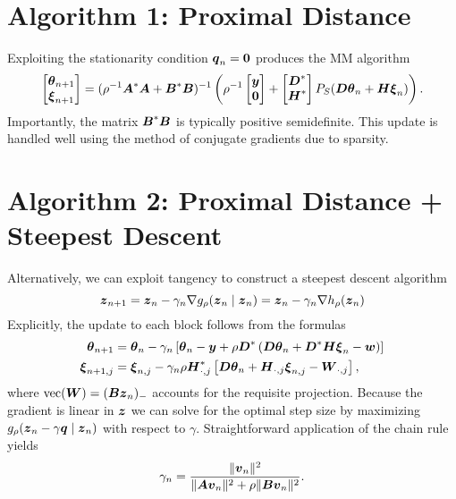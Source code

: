 \documentclass{article}
\begin{document}
\section*{\center Algorithm 1: Proximal Distance}
Exploiting the stationarity condition \(\boldsymbol{q}_{n} = \boldsymbol{0}\) produces the MM algorithm
\begin{equation*}
    \begin{bmatrix}
        \boldsymbol{\theta}_{n+1} \\
        \boldsymbol{\xi}_{n+1}
    \end{bmatrix}
    =
    (\rho^{-1}\boldsymbol{A}^{\ast} \boldsymbol{A} + \boldsymbol{B}^{\ast} \boldsymbol{B})^{-1}
    \left(
    \rho^{-1}
    \begin{bmatrix}
        \boldsymbol{y} \\
        \boldsymbol{0}
    \end{bmatrix}
    +
    \begin{bmatrix}
        \boldsymbol{D}^{\ast} \\
        \boldsymbol{H}^{\ast}
    \end{bmatrix}
    P_{S}(\boldsymbol{D} \boldsymbol{\theta}_{n} + \boldsymbol{H} \boldsymbol{\xi}_{n})\right).
\end{equation*}
Importantly, the matrix \(\boldsymbol{B}^{\ast} \boldsymbol{B}\) is typically positive semidefinite.
This update is handled well using the method of conjugate gradients due to sparsity.

\section*{\center Algorithm 2: Proximal Distance + Steepest Descent}

Alternatively, we can exploit tangency to construct a steepest descent algorithm
\begin{equation*}
    \boldsymbol{z}_{n+1}
    =
    \boldsymbol{z}_{n} - \gamma_{n} \nabla g_{\rho}(\boldsymbol{z}_{n} \mid \boldsymbol{z}_{n})
    =
    \boldsymbol{z}_{n} - \gamma_{n} \nabla h_{\rho}(\boldsymbol{z}_{n})
\end{equation*}
Explicitly, the update to each block follows from the formulas
\begin{align*}
    \boldsymbol{\theta}_{n+1}
    &=
    \boldsymbol{\theta}_{n} - \gamma_{n}\left[
        \boldsymbol{\theta}_{n} - \boldsymbol{y}
        + \rho \boldsymbol{D}^{\ast} \left(\boldsymbol{D} \boldsymbol{\theta}_{n}
        + \boldsymbol{D}^{\ast} \boldsymbol{H} \boldsymbol{\xi}_{n} - \boldsymbol{w}
        \right)
    \right] \\
    \boldsymbol{\xi}_{n+1,j}
    &=
    \boldsymbol{\xi}_{n,j} - \gamma_{n} \rho \boldsymbol{H}_{\cdot,j}^{\ast}\left[
        \boldsymbol{D} \boldsymbol{\theta}_{n}
        + \boldsymbol{H}_{\cdot,j} \boldsymbol{\xi}_{n,j}
        - \boldsymbol{W}_{\cdot,j}
    \right],
\end{align*}
where \(\mathop{\rm vec}\nolimits(\boldsymbol{W}) = (\boldsymbol{B} \boldsymbol{z}_{n})_{-}\) accounts for the requisite projection.
Because the gradient is linear in \(\boldsymbol{z}\) we can solve for the optimal step size by maximizing \(g_{\rho}(\boldsymbol{z}_{n} - \gamma \boldsymbol{q} \mid \boldsymbol{z}_{n})\) with respect to \(\gamma\).
Straightforward application of the chain rule yields
\begin{equation*}
    \gamma_{n}
    =
    \frac{\|\boldsymbol{v}_{n}\|^{2}}{\|\boldsymbol{A} \boldsymbol{v}_{n}\|^{2} + \rho \|\boldsymbol{B} \boldsymbol{v}_{n}\|^{2}}.
\end{equation*}
\end{document}
